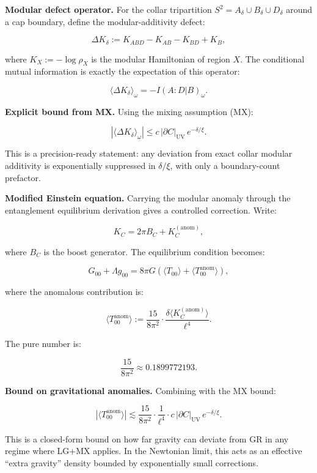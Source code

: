 \documentclass[11pt,a4paper]{article}
\theoremstyle{remark}
\begin{document}
\textbf{Modular defect operator.} For the collar tripartition \(S^2 = A_\delta \cup
B_\delta \cup D_\delta\) around a cap boundary, define the modular-additivity
defect:

\[
\Delta K_\delta := K_{ABD} - K_{AB} - K_{BD} + K_B,
\]

where \(K_X := -\log \rho_X\) is the modular Hamiltonian of region \(X\). The
conditional mutual information is exactly the expectation of this operator:

\[
\langle \Delta K_\delta \rangle_\omega = -I(A:D|B)_\omega.
\]

\textbf{Explicit bound from MX.} Using the mixing assumption (MX):

\[
\left| \langle \Delta K_\delta \rangle_\omega \right|
\le c \, |\partial C|_{\mathrm{UV}} \, e^{-\delta/\xi}.
\]

This is a precision-ready statement: any deviation from exact collar modular
additivity is exponentially suppressed in \(\delta/\xi\), with only a
boundary-count prefactor.

\textbf{Modified Einstein equation.} Carrying the modular anomaly through the
entanglement equilibrium derivation gives a controlled correction. Write:

\[
K_C = 2\pi B_C + K_C^{\mathrm{(anom)}},
\]

where \(B_C\) is the boost generator. The equilibrium condition becomes:

\[
G_{00} + \Lambda g_{00} = 8\pi G \left( \langle T_{00} \rangle
+ \langle T_{00}^{\mathrm{anom}} \rangle \right),
\]

where the anomalous contribution is:

\[
\langle T_{00}^{\mathrm{anom}} \rangle
:= \frac{15}{8\pi^2} \cdot \frac{\delta \langle K_C^{\mathrm{(anom)}} \rangle}{\ell^4}.
\]

The pure number is:

\[
\frac{15}{8\pi^2} \approx 0.1899772193.
\]

\textbf{Bound on gravitational anomalies.} Combining with the MX bound:

\[
\left| \langle T_{00}^{\mathrm{anom}} \rangle \right|
\lesssim \frac{15}{8\pi^2} \cdot \frac{1}{\ell^4} \cdot
c \, |\partial C|_{\mathrm{UV}} \, e^{-\delta/\xi}.
\]

This is a closed-form bound on how far gravity can deviate from GR in any
regime where LG+MX applies. In the Newtonian limit, this acts as an effective
``extra gravity'' density bounded by exponentially small corrections.
\end{document}
